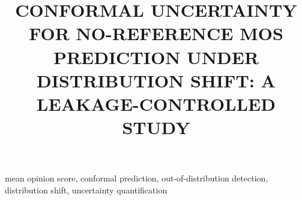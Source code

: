 \documentclass{article}
\title{CONFORMAL UNCERTAINTY FOR NO-REFERENCE MOS PREDICTION UNDER DISTRIBUTION SHIFT: A LEAKAGE-CONTROLLED STUDY}
\begin{document}

\maketitle



\begin{keywords}
mean opinion score, conformal prediction, out-of-distribution detection,
distribution shift, uncertainty quantification
\end{keywords}







\balance


\end{document}
